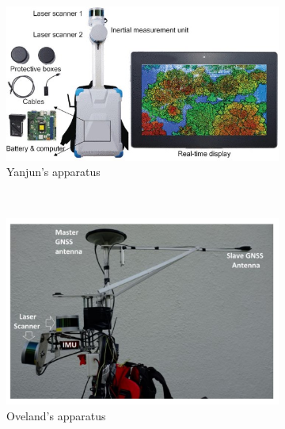 \begin{figure}[H]
\begin{subfigure}{0.45\textwidth}
        \label{fig: Xiao apparatus}
    \end{subfigure}
    \\[3ex]
    \begin{subfigure}{0.9\textwidth}
        \includegraphics[width=\linewidth]{images/background/su_apparatus.jpg}
        \caption{Yanjun's apparatus \cite{su_development_2021}}
        \label{fig: yanjun apparatus}
    \end{subfigure}
    \\[3ex]
    \begin{subfigure}{0.45\textwidth}
        \includegraphics[width=\linewidth]{images/background/oveland_apparatus.jpg}
        \caption{Oveland's apparatus \cite{oveland_comparing_2018}}
        \label{fig: oveland apparatus}
    \end{subfigure}
    \begin{subfigure}{0.45\textwidth}

\end{subfigure}
\end{figure}
